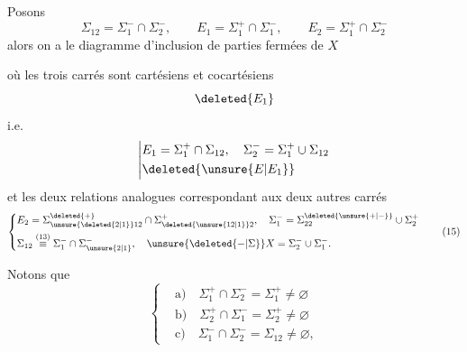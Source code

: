 \begingroup
\makeatletter\tagsleft@true\makeatother
Posons
\[
\Sigma_{12}=\Sigma_1^-\cap\Sigma_2^-,\qquad
E_1=\Sigma_1^+\cap\Sigma_1^-,\qquad
E_2=\Sigma_1^+\cap\Sigma_2^-\tag*{(13)}
\]
alors on a le diagramme d'inclusion de parties fermées de $X$

\usetikzlibrary{decorations.pathmorphing}


où les trois carrés sont cartésiens et cocartésiens
\[
\deleted{E_1}
\]
i.e.
\[
\left|\begin{aligned}
&E_1=\Sigma_1^+\cap\Sigma_{12},\quad\Sigma_2^-=\Sigma_1^+\cup\Sigma_{12}\\
&\deleted{\unsure{E|E_1}}
\end{aligned}\right.
\]
et les deux relations analogues correspondant aux deux autres carrés
\[
\left\{\begin{aligned}
&E_2=\Sigma_{\unsure{\deleted{2|1}}12}^{\deleted{+}}\cap\Sigma_{\deleted{\unsure{12|1}}2}^+,\quad
\Sigma_1^-=\Sigma_{22}^{\deleted{\unsure{+|-}}}\cup\Sigma_2^+\\
&\Sigma_{12}\overset{(13)}{\equiv}\Sigma_1^-\cap\Sigma_{\unsure{2|1}}^-,\quad
\unsure{\deleted{-|\Sigma}}X=\Sigma_2^-\cup\Sigma_1^-.
\end{aligned}\right.\tag*{(15)}
\]

Notons que
\[
\left\{\begin{aligned}
&\text{a)}\quad\Sigma_1^+\cap\Sigma_2^-=\Sigma_1^+\ne\varnothing\\
&\text{b)}\quad\Sigma_2^+\cap\Sigma_1^-=\Sigma_2^+\ne\varnothing\\
&\text{c)}\quad\Sigma_1^-\cap\Sigma_2^-=\Sigma_{12}\ne\varnothing,
\end{aligned}\right.\tag*{(16)}
\]

